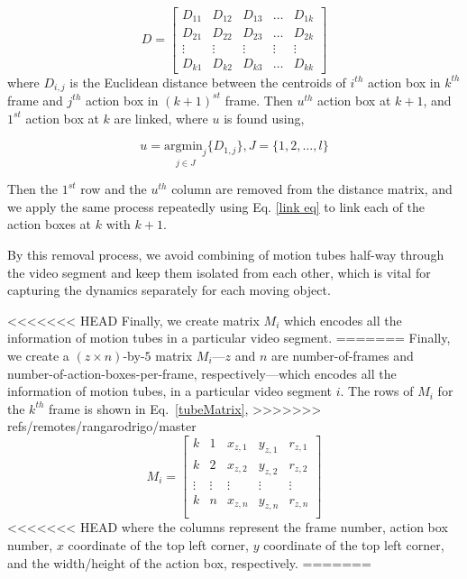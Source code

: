 \begin{equation}
D=\begin{bmatrix}
    D_{11}       & D_{12} & D_{13} & \dots & D_{1k} \\
    D_{21}       & D_{22} & D_{23} & \dots & D_{2k} \\
    \vdots       & \vdots & \vdots & \vdots & \vdots \\
    D_{k1}       & D_{k2} & D_{k3} & \dots & D_{kk}
\end{bmatrix}
\end{equation}
where $D_{i,j}$ is the Euclidean distance between the centroids of $i^{th}$ action box in $k^{th}$ frame and $j^{th}$ action box in $(k+1)^{st}$ frame.
Then $u^{th}$ action box at $k+1$, and $1^{st}$ action box at $k$ are linked, where $u$ is found using,


\begin{equation}
u=\underset{j\in J}{\mathrm{argmin}_j}\{D_{1,j}\}, J=\{1,2,\dots,l\}
\label{link eq}
\end{equation}


Then the $1^{st}$ row and the $u^{th}$ column are removed from the distance matrix, and we apply the same process repeatedly using Eq. \ref{link eq}
to link each of the action boxes at $k$ with $k+1$.

By this removal process, we avoid combining of motion tubes half-way through
the video segment and keep them isolated from each other, which is vital for capturing the dynamics separately for each moving object.




<<<<<<< HEAD
Finally, we create matrix $M_{i}$ which encodes all the information of motion tubes in a particular video segment.
=======
Finally, we create a $(z\times n)$-by-$5$ matrix $M_{i}$---$z$ and $n$ are number-of-frames and number-of-action-boxes-per-frame, respectively---which
encodes all the information of motion tubes, in a particular video segment $i$. The rows of $M_{i}$ for the $k^{th}$ frame is shown in Eq.~\ref{tubeMatrix},
>>>>>>> refs/remotes/rangarodrigo/master
\begin{equation}
M_{i}=\begin{bmatrix}
    k       & 1 & x_{z,1} & y_{z,1} & r_{z,1} \\
    k       & 2 & x_{z,2} & y_{z,2} & r_{z,2} \\
    \vdots       & \vdots & \vdots & \vdots & \vdots \\
    k       & n & x_{z,n} & y_{z,n} & r_{z,n} \\
\end{bmatrix}
\label{tubeMatrix}
\end{equation}
<<<<<<< HEAD
where the columns represent the frame number, action box number, $x$ coordinate of the top left corner,
$y$ coordinate of the top left corner, and the width/height of the action box, respectively.
=======

